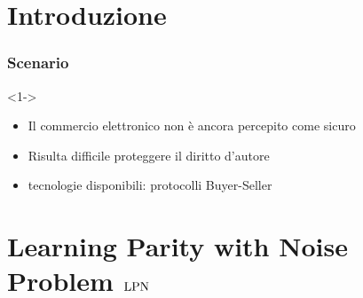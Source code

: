 \section{Introduzione}
\begin{frame}
 \frametitle{Scenario}
   \begin{block}<1->{}
    \begin{itemize}
     \item Il commercio elettronico non è ancora percepito come sicuro
     \item Risulta difficile proteggere il diritto d'autore
     \item tecnologie disponibili: protocolli Buyer-Seller
    \end{itemize}
   \end{block}
\end{frame}

\section{Learning Parity with Noise Problem $\mathrm{LPN}$}

